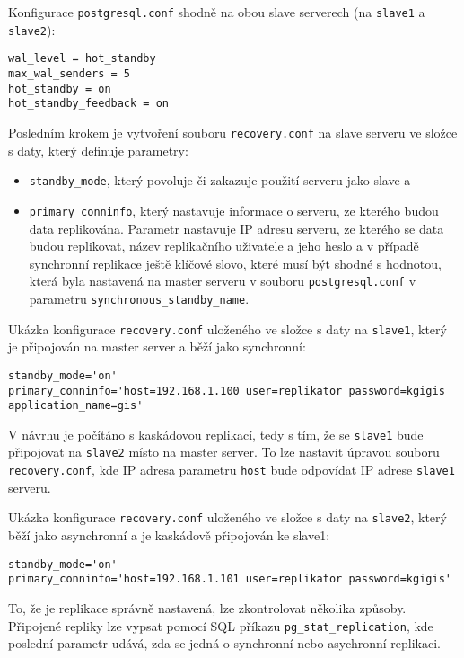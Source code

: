 Konfigurace \texttt{postgresql.conf} shodně na obou slave serverech (na \texttt{slave1} a \texttt{slave2}): 
\begin{lstlisting}
wal_level = hot_standby
max_wal_senders = 5
hot_standby = on	
hot_standby_feedback = on
\end{lstlisting}

Posledním krokem je vytvoření souboru \texttt{recovery.conf} na slave serveru ve složce s daty, který definuje parametry:
\begin{itemize}
\item \texttt{standby\_mode}, který povoluje či zakazuje použití serveru jako slave a
\item \texttt{primary\_conninfo}, který nastavuje informace o serveru, ze kterého budou data replikována. Parametr nastavuje IP adresu serveru, ze kterého se data budou replikovat, název replikačního uživatele a jeho heslo a v případě synchronní replikace ještě klíčové slovo, které musí být shodné s hodnotou, která byla nastavená na master serveru v souboru \texttt{postgresql.conf} v parametru \texttt{synchronous\_standby\_name}.
\end{itemize}

Ukázka konfigurace \texttt{recovery.conf} uloženého ve složce s daty na \texttt{slave1}, který je připojován na master server a běží jako synchronní:

\begin{lstlisting}
standby_mode='on'
primary_conninfo='host=192.168.1.100 user=replikator password=kgigis application_name=gis'  
\end{lstlisting}

V návrhu je počítáno s kaskádovou replikací, tedy s tím, že se \texttt{slave1} bude připojovat na \texttt{slave2} místo na master server. To lze nastavit úpravou souboru \texttt{recovery.conf}, kde IP adresa parametru \texttt{host} bude odpovídat IP adrese \texttt{slave1} serveru. 

Ukázka konfigurace \texttt{recovery.conf} uloženého ve složce s daty na \texttt{slave2}, který běží jako asynchronní a je kaskádově připojován ke slave1:

\begin{lstlisting}
standby_mode='on'
primary_conninfo='host=192.168.1.101 user=replikator password=kgigis'
\end{lstlisting}

To, že je replikace správně nastavená, lze zkontrolovat několika způsoby. Připojené repliky lze vypsat pomocí SQL příkazu \texttt{pg\_stat\_replication}, kde poslední parametr udává, zda se jedná o synchronní nebo asychronní replikaci. 

